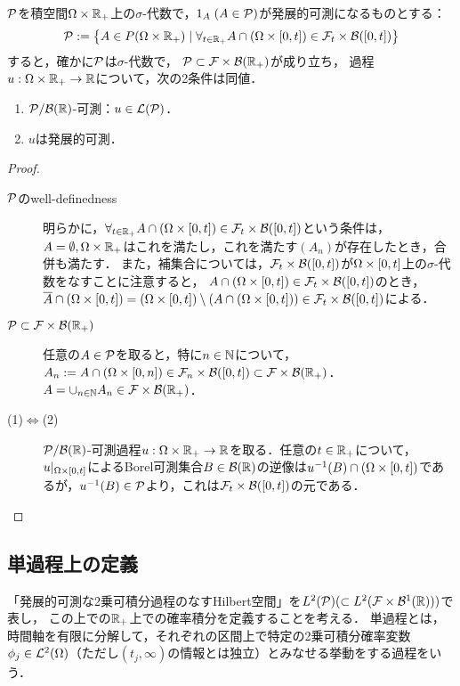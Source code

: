 \documentclass[uplatex,dvipdfmx]{jsreport}
\begin{document}
\begin{lemma}[発展的可測性の特徴付け]
    $\P$を積空間$\Om\times\R_+$上の$\sigma$-代数で，$1_A\;(A\in\P)$が発展的可測になるものとする：
    \[\P:=\Brace{A\in P(\Om\times\R_+)\mid\forall_{t\in\R_+} A\cap(\Om\times[0,t])\in\F_t\times\B([0,t])}\]
    すると，確かに$\P$は$\sigma$-代数で，
    $\P\subset\F\times\B(\R_+)$が成り立ち，
    過程$u:\Om\times\R_+\to\R$について，次の2条件は同値．
    \begin{enumerate}
        \item $\P/\B(\R)$-可測：$u\in\L(\P)$．
        \item $u$は発展的可測．
    \end{enumerate}
\end{lemma}
\begin{proof}\mbox{}
    \begin{description}
        \item[$\P$のwell-definedness] 明らかに，$\forall_{t\in\R_+} A\cap(\Om\times[0,t])\in\F_t\times\B([0,t])$という条件は，$A=\emptyset,\Om\times\R_+$はこれを満たし，これを満たす$(A_n)$が存在したとき，合併も満たす．
        また，補集合については，$\F_t\times\B([0,t])$が$\Om\times[0,t]$上の$\sigma$-代数をなすことに注意すると，
        $A\cap(\Om\times[0,t])\in\F_t\times\B([0,t])$のとき，
        $\o{A}\cap(\Om\times[0,t])=(\Om\times[0,t])\setminus (A\cap(\Om\times[0,t]))\in\F_t\times\B([0,t])$による．
        \item[$\P\subset\F\times\B(\R_+)$] 
        任意の$A\in\P$を取ると，特に$n\in\N$について，$A_n:=A\cap(\Om\times[0,n])\in\F_n\times\B([0,t])\subset\F\times\B(\R_+)$．
        $A=\cup_{n\in\N}A_n\in\F\times\B(\R_+)$．
        \item[(1)$\Leftrightarrow$(2)] $\P/\B(\R)$-可測過程$u:\Om\times\R_+\to\R$を取る．任意の$t\in\R_+$について，$u|_{\Om\times[0,t]}$によるBorel可測集合$B\in\B(\R)$の逆像は$u^{-1}(B)\cap(\Om\times[0,t])$であるが，$u^{-1}(B)\in\P$より，これは$\F_t\times\B([0,t])$の元である．
    \end{description}
\end{proof}

\subsection{単過程上の定義}

\begin{tcolorbox}[colframe=ForestGreen, colback=ForestGreen!10!white,breakable,colbacktitle=ForestGreen!40!white,coltitle=black,fonttitle=\bfseries\sffamily,
title=]
    「発展的可測な2乗可積分過程のなすHilbert空間」を$L^2(\P)(\subset L^2(\F\times\B^1(\R)))$で表し，
    この上での$\R_+$上での確率積分を定義することを考える．
    単過程とは，時間軸を有限に分解して，それぞれの区間上で特定の2乗可積分確率変数$\phi_j\in\L^2(\Om)$（ただし$(t_j,\infty)$の情報とは独立）とみなせる挙動をする過程をいう．
\end{tcolorbox}
\end{document}
